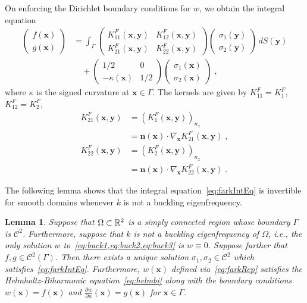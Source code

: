 \documentclass[preprint,12pt]{article}
\def\bn{{\boldsymbol n}}
\def\xx{{\boldsymbol x}}
\def\bx{{\boldsymbol x}}
\def\yy{{\boldsymbol y}}
\newcommand\dwdn{\frac{\partial w}{\partial n}}
\newcommand{\cC}{\mathcal C}
\newtheorem{lem}{Lemma}
\begin{document}
On enforcing the Dirichlet boundary conditions for
$w$, we obtain the integral equation
\begin{equation}
  \begin{split}
    \begin{pmatrix}
      f(\xx) \\
      g(\xx)
    \end{pmatrix} &= 
    \int_\Gamma
    \begin{pmatrix}
      K_{11}^F(\xx,\yy) & K_{12}^F(\xx,\yy) \\
      K_{21}^F(\xx,\yy) & K_{22}^F(\xx,\yy)
    \end{pmatrix}
    \begin{pmatrix}
      \sigma_1(\yy)\\
      \sigma_2(\yy)
    \end{pmatrix}
    \, dS(\yy) \\
    &\quad + \begin{pmatrix}
      1/2 & 0 \\
      -\kappa(\xx) & 1/2
    \end{pmatrix}
    \begin{pmatrix}
      \sigma_1(\xx)\\
      \sigma_2(\xx)
    \end{pmatrix} \; , \label{eq:farkIntEq} 
  \end{split}
\end{equation}
where $\kappa$ is the signed curvature at $\xx \in \Gamma$.
The kernels are given
by $K_{11}^F = K_1^F$, $K_{12}^F = K_2^F$,
\begin{align}
  K_{21}^F(\xx,\yy) &= \left(K_1^F(\xx,\yy)\right )_{n_x} \nonumber \\
  &= \bn(\xx) \cdot \nabla_{\xx} K_{21}^{F}(\xx,\yy) \; \label{eq:farkK21},\\
  K_{22}^F(\xx,\yy) &= \left(K_2^F(\xx,\yy)\right )_{n_x} \nonumber \\
  &= \bn(\xx) \cdot \nabla_{\xx} K_{22}^{F}(\xx,\yy) \label{eq:farkK22} \; .
\end{align}

The following lemma shows that the integral equation~\cref{eq:farkIntEq} is invertible for smooth domains
whenever $k$ is not a buckling eigenfrequency. 

\begin{lem}
Suppose that $\Omega \subset \mathbb{R}^2$ is a simply connected region whose boundary $\Gamma$ is $\cC^{2}$. 
Furthermore, suppose that $k$ is not a buckling eigenfrequency of $\Omega$, i.e., the only solution $w$ to~\cref{eq:buck1,eq:buck2,eq:buck3} is  $w \equiv 0$. Suppose further that $f,g \in \cC^{2}(\Gamma)$. 
Then there exists a unique solution $\sigma_{1},\sigma_{2} \in \cC^{2}$ which satisfies~\cref{eq:farkIntEq}. 
Furthermore, $w(\bx)$ defined via~\cref{eq:farkRep} satisfies the Helmholtz-Biharmonic equation~\cref{eq:helmbi}
along with the boundary conditions $w(\bx)=f(\bx)$ and $\dwdn(\bx) = g(\bx)$ for $\bx \in\Gamma$. 
\end{lem}
\end{document}
